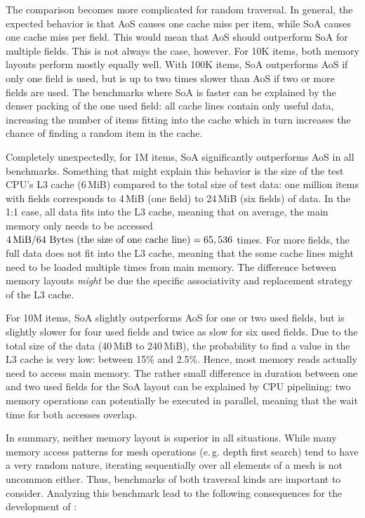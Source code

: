 The comparison becomes more complicated for random traversal.
In general, the expected behavior is that AoS causes one cache miss per item, while SoA causes one cache miss per field.
This would mean that AoS should outperform SoA for multiple fields.
This is not always the case, however.
For 10K items, both memory layouts perform mostly equally well.
With 100K items, SoA outperforms AoS if only one field is used, but is up to two times slower than AoS if two or more fields are used.
The benchmarks where SoA is faster can be explained by the denser packing of the one used field: all cache lines contain only useful data, increasing the number of items fitting into the cache which in turn increases the chance of finding a random item in the cache.

Completely unexpectedly, for 1M items, SoA significantly outperforms AoS in all benchmarks.
Something that might explain this behavior is the size of the test CPU's L3 cache (6\,MiB) compared to the total size of test data:
one million items with  fields corresponds to 4\,MiB (one field) to 24\,MiB (six fields) of data.
In the \textsf{1:1} case, all data fits into the L3 cache, meaning that on average, the main memory only needs to be accessed $4 \text{\,MiB} / 64 \text{ Bytes (the size of one cache line)} = 65,536$ times.
For more fields, the full data does not fit into the L3 cache, meaning that the some cache lines might need to be loaded multiple times from main memory.
The difference between memory layouts \emph{might} be due the specific associativity and replacement strategy of the L3 cache.

For 10M items, SoA slightly outperforms AoS for one or two used fields, but is slightly slower for four used fields and twice as slow for six used fields.
Due to the total size of the data (40\,MiB to 240\,MiB), the probability to find a value in the L3 cache is very low: between 15\% and 2.5\%.
Hence, most memory reads actually need to access main memory.
The rather small difference in duration between one and two used fields for the SoA layout can be explained by CPU pipelining: two memory operations can potentially be executed in parallel, meaning that the wait time for both accesses overlap.

\vspace{1.5cm}

In summary, neither memory layout is superior in all situations.
While many memory access patterns for mesh operations (e.\,g. depth first search) tend to have a very random nature, iterating sequentially over all elements of a mesh is not uncommon either.
Thus, benchmarks of both traversal kinds are important to consider.
Analyzing this benchmark lead to the following consequences for the development of :

